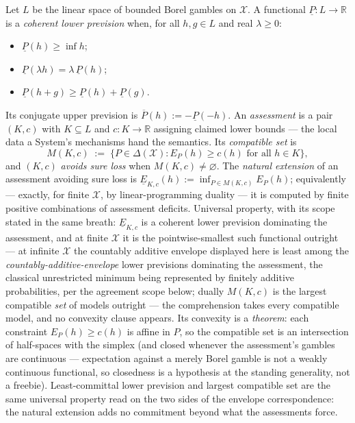 \begin{definition}
\label{def:su-natural-extension}
Let $L$ be the linear space of bounded Borel gambles on
$\mathcal{X}$. A functional
$\underline{P} \colon L \to \mathbb{R}$ is a \emph{coherent lower
prevision} when, for all $h, g \in L$ and real $\lambda \ge 0$:
\begin{itemize}
\item[(W1)] $\underline{P}(h) \ge \inf h$;
\item[(W2)] $\underline{P}(\lambda h) = \lambda\,\underline{P}(h)$;
\item[(W3)] $\underline{P}(h + g) \ge \underline{P}(h) +
  \underline{P}(g)$.
\end{itemize}
Its conjugate upper prevision is
$\overline{P}(h) := -\underline{P}(-h)$. An \emph{assessment} is a
pair $(K, c)$ with $K \subseteq L$ and $c \colon K \to \mathbb{R}$
assigning claimed lower bounds --- the local data a System's
mechanisms hand the semantics. Its \emph{compatible set} is
\[
  M(K, c) \;:=\;
  \bigl\{P \in \Delta(\mathcal{X}) :
    E_P(h) \ge c(h) \text{ for all } h \in K\bigr\},
\]
and $(K,c)$ \emph{avoids sure loss} when $M(K,c) \neq \varnothing$.
The \emph{natural extension} of an assessment avoiding sure loss is
$\underline{E}_{K,c}(h) := \inf_{P \in M(K,c)} E_P(h)$; equivalently
--- exactly, for finite $\mathcal{X}$, by linear-programming duality
--- it is computed by finite positive combinations of assessment
deficits. Universal property, with its scope stated in the same
breath: $\underline{E}_{K,c}$ is a coherent lower prevision
dominating the assessment, and at finite $\mathcal{X}$ it is the
pointwise-smallest such functional outright --- at infinite
$\mathcal{X}$ the countably additive envelope displayed here is
least among the \emph{countably-additive-envelope} lower previsions
dominating the assessment, the classical unrestricted minimum being
represented by finitely additive probabilities, per the agreement
scope below; dually $M(K,c)$ is the largest compatible \emph{set} of
models outright --- the comprehension takes every compatible model,
and no convexity clause appears. Its convexity is a \emph{theorem}:
each constraint $E_P(h) \ge c(h)$ is affine in $P$, so the compatible
set is an intersection of half-spaces with the simplex (and closed
whenever the assessment's gambles are continuous --- expectation
against a merely Borel gamble is not a weakly continuous functional,
so closedness is a hypothesis at the standing generality, not a
freebie).
Least-committal lower prevision and largest compatible set are the
same universal property read on the two sides of the envelope
correspondence: the natural extension adds no commitment beyond what
the assessments force.
\end{definition}

